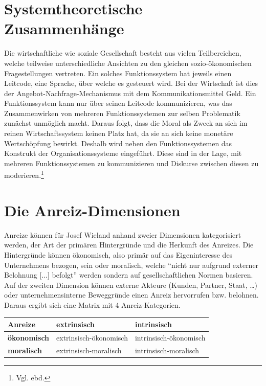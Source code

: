 \documentclass[12pt]{article}
\begin{document}
\section{Systemtheoretische Zusammenhänge}
Die wirtschaftliche wie soziale Gesellschaft besteht aus vielen Teilbereichen, welche teilweise unterschiedliche Ansichten zu den gleichen sozio-ökonomischen Fragestellungen vertreten. Ein solches Funktionssystem hat jeweils einen Leitcode, eine Sprache, über welche es gesteuert wird. Bei der Wirtschaft ist dies der Angebot-Nachfrage-Mechanismus mit dem Kommunikationsmittel Geld. Ein Funktionssystem kann nur über seinen Leitcode kommunizieren, was das Zusammenwirken von mehreren Funktionssystemen zur selben Problematik zunächst unmöglich macht. Daraus folgt, dass die Moral als Zweck an sich im reinen Wirtschaftssystem keinen Platz hat, da sie an sich keine monetäre Wertschöpfung bewirkt. Deshalb wird neben den Funktionssystemen das Konstrukt der Organisationssysteme eingeführt. Diese sind in der Lage, mit mehreren Funktionssystemen zu kommunizieren und Diskurse zwischen diesen zu moderieren.\footnote{Vgl. ebd.}
\section{Die Anreiz-Dimensionen}
Anreize können für Josef Wieland anhand zweier Dimensionen kategorisiert werden, der Art der primären Hintergründe und die Herkunft des Anreizes. Die Hintergründe können ökonomisch, also primär auf das Eigeninteresse des Unternehmens bezogen, sein oder moralisch, welche “nicht nur aufgrund externer Belohnung [...] befolgt” werden sondern auf gesellschaftlichen Normen basieren. Auf der zweiten Dimension können externe Akteure (Kunden, Partner, Staat, …) oder unternehmensinterne Beweggründe einen Anreiz hervorrufen bzw. belohnen. Daraus ergibt sich eine Matrix mit 4 Anreiz-Kategorien.
\begin{center}
\begin{tabular}{|p{3cm}|p{5cm}|p{5cm}|}
\hline
Anreize & \textbf{extrinsisch} & \textbf{intrinsisch}\\\hline
\textbf{ökonomisch} & extrinsisch-ökonomisch & intrinsisch-ökonomisch\\\hline
\textbf{moralisch} & extrinsisch-moralisch & intrinsisch-moralisch\\\hline
\end{tabular}
\end{center}
\end{document}
